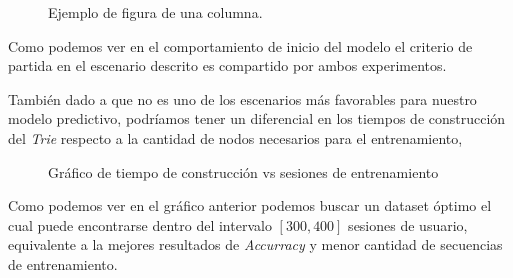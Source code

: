 	
	
	
	\begin{figure}[h] 
		\centering
		
		\caption{Ejemplo de figura de una columna.}
		\label{fig:sim}
	\end{figure}
	
	
	



	Como podemos ver en el comportamiento de inicio del modelo el criterio de partida en el escenario descrito es compartido por ambos experimentos.

	También dado a que no es uno de los escenarios más favorables para nuestro modelo predictivo, podríamos tener un diferencial en los tiempos de construcción del \emph{Trie} respecto a la cantidad de nodos necesarios para el entrenamiento, 

	\begin{figure}[h] 
	\centering
		\caption{Gráfico de tiempo de construcción vs sesiones de entrenamiento}
	  \label{fig:sim}
	 \end{figure}	
	
	Como podemos ver en el gráfico anterior podemos buscar un dataset óptimo el cual puede encontrarse dentro del intervalo $ [ 300,400 ]$ sesiones de usuario, equivalente a la mejores resultados de \emph{Accurracy} y menor cantidad de secuencias de entrenamiento.